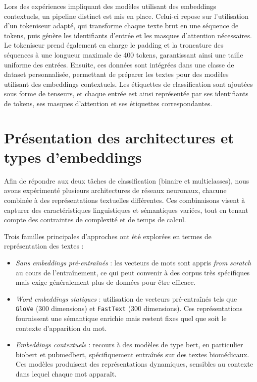 \documentclass[12pt]{report}
\begin{document}
Lors des expériences impliquant des modèles utilisant des embeddings contextuels, un pipeline distinct est mis en place. Celui-ci repose sur l’utilisation d'un tokeniseur adapté, qui transforme chaque texte brut en une séquence de tokens, puis génère les identifiants d'entrée et les masques d'attention nécessaires. Le tokeniseur prend également en charge le padding et la troncature des séquences à une longueur maximale de 400 tokens, garantissant ainsi une taille uniforme des entrées. Ensuite, ces données sont intégrées dans une classe de dataset personnalisée, permettant de préparer les textes pour des modèles utilisant des embeddings contextuels. Les étiquettes de classification sont ajoutées sous forme de tenseurs, et chaque entrée est ainsi représentée par ses identifiants de tokens, ses masques d'attention et ses étiquettes correspondantes. 

\section{Présentation des architectures et types d’embeddings}

Afin de répondre aux deux tâches de classification (binaire et multiclasses), nous avons expérimenté plusieurs architectures de réseaux neuronaux, chacune combinée à des représentations textuelles différentes. Ces combinaisons visent à capturer des caractéristiques linguistiques et sémantiques variées, tout en tenant compte des contraintes de complexité et de temps de calcul.

Trois familles principales d’approches ont été explorées en termes de représentation des textes :

\begin{itemize}
    \item \textit{Sans embeddings pré-entraînés} : les vecteurs de mots sont appris \textit{from scratch} au cours de l'entraînement, ce qui peut convenir à des corpus très spécifiques mais exige généralement plus de données pour être efficace.
    
    \item \textit{Word embeddings statiques} : utilisation de vecteurs pré-entraînés tels que \texttt{GloVe} (300 dimensions) et \texttt{FastText} (300 dimensions). Ces représentations fournissent une sémantique enrichie mais restent fixes quel que soit le contexte d’apparition du mot.
    
    \item \textit{Embeddings contextuels} : recours à des modèles de type \gls{bert}, en particulier \gls{biobert} et \gls{pubmedbert}, spécifiquement entraînés sur des textes biomédicaux. Ces modèles produisent des représentations dynamiques, sensibles au contexte dans lequel chaque mot apparaît.
\end{itemize}
\end{document}
